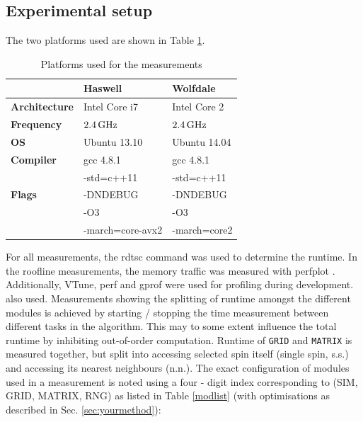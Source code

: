 \documentclass[letterpaper]{article}
\begin{document}
\subsection{Experimental setup} \label{exp:setup}
The two platforms used are shown in Table \ref{platforms}. 
\begin{table}[h]
\begin{tabular}{lll}
 & \textbf{Haswell} & \textbf{Wolfdale}\\\hline
\textbf{Architecture} & Intel Core i7 & Intel Core 2\\\hline
\textbf{Frequency} & $\unit[2.4]{GHz}$ & $\unit[2.4]{GHz}$\\\hline
\textbf{OS} & Ubuntu 13.10 & Ubuntu 14.04\\\hline
\textbf{Compiler} & gcc 4.8.1 & gcc 4.8.1\\\hline
 & -std=c++11  & -std=c++11  \\
\textbf{Flags}& -DNDEBUG & -DNDEBUG \\
& -O3  &  -O3 \\
& -march=core-avx2 & -march=core2 \\
\end{tabular}
\caption{Platforms used for the measurements}
\label{platforms}
\end{table}
\newline For all measurements, the rdtsc command was used to determine the runtime. In the roofline measurements, the memory traffic was measured with perfplot \cite{PERFPLOT}. Additionally, VTune, perf and gprof were used for profiling during development.
also used.\newline
Measurements showing the splitting of runtime amongst the different modules is achieved by starting / stopping the time measurement between different tasks in the algorithm. This may to some extent influence the total runtime by inhibiting out-of-order computation.\newline
Runtime of \texttt{GRID} and \texttt{MATRIX} is measured together, but split into accessing selected spin itself (single spin, s.s.) and accessing its nearest neighbours (n.n.). \newline
The exact configuration of modules used in a measurement is noted using a four - digit index corresponding to (SIM, GRID, MATRIX, RNG) as listed in Table \ref{modlist} (with optimisations as described in Sec. \ref{sec:yourmethod}):
\end{document}
